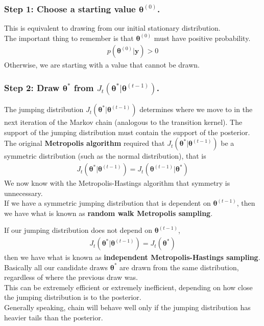 \documentclass[handout]{beamer}
\begin{document}
\begin{frame}
\frametitle{Step 1: Choose a starting value $\bm{\theta}^{(0)}$.}
\pause
This is equivalent to drawing from our initial stationary distribution.\\
\bigskip
\pause
The important thing to remember is that $\bm{\theta}^{(0)}$ must have
positive probability.
\begin{eqnarray*}
p(\bm{\theta}^{(0)} | \bm{y}) > 0
\end{eqnarray*}
\bigskip
\pause
Otherwise, we are starting with a value that cannot be drawn.
\end{frame}

\begin{frame}
\frametitle{Step 2: Draw $\bm{\theta}^*$ from $J_t(\bm{\theta}^* | \bm{\theta}^{(t-1)})$.}
\pause
The jumping distribution  $J_t(\bm{\theta}^* | \bm{\theta}^{(t-1)})$
determines where we move to in the next iteration of the Markov chain
(analogous to the transition kernel).
\pause
The support of the jumping distribution must contain the support of
the posterior. \\
\pause
\bigskip
The original \textbf{Metropolis algorithm} required that
$J_t(\bm{\theta}^* | \bm{\theta}^{(t-1)})$ be a symmetric
distribution (such as the normal distribution), \pause that is
\begin{eqnarray*}
 J_t(\bm{\theta}^* | \bm{\theta}^{(t-1)}) = J_t(\bm{\theta}^{(t-1)} | \bm{\theta}^*)
\end{eqnarray*}
\pause
We now know with the Metropolis-Hastings algorithm that symmetry is
unnecessary.  \\
\bigskip
\pause
If we have a symmetric jumping distribution that is dependent on
$\bm{\theta}^{(t-1)}$, then we have what is known as \textbf{random walk Metropolis sampling}.
\end{frame}

\begin{frame}
If our jumping distribution does not depend on $\bm{\theta}^{(t-1)}$, 
\pause
\begin{eqnarray*}
J_t(\bm{\theta}^* | \bm{\theta}^{(t-1)}) = J_t(\bm{\theta}^*)
\end{eqnarray*}
\pause
then we have what is known as \textbf{independent Metropolis-Hastings sampling}.\\
\bigskip
\pause
Basically all our candidate draws $\bm{\theta}^*$ are drawn from the
same distribution, regardless of where the previous draw was.\\
\bigskip
\pause
This can be extremely efficient or extremely inefficient, depending on
how close the jumping distribution is to the posterior.\\
\bigskip
\pause
Generally speaking, chain will behave well only if the jumping
distribution has heavier tails than the posterior.
\end{frame}
\end{document}
